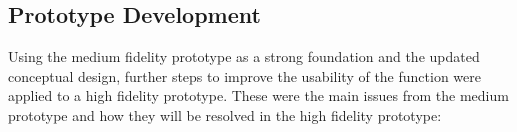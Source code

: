 \documentclass[a4 paper, 12pt]{article}
\begin{document}
    \subsection{Prototype Development}
    Using the medium fidelity prototype as a strong foundation and the updated conceptual design, further steps to improve the usability of the function were applied to a high fidelity prototype. These were the main issues from the medium prototype and how they will be resolved in the high fidelity prototype:
      
\end{document}
